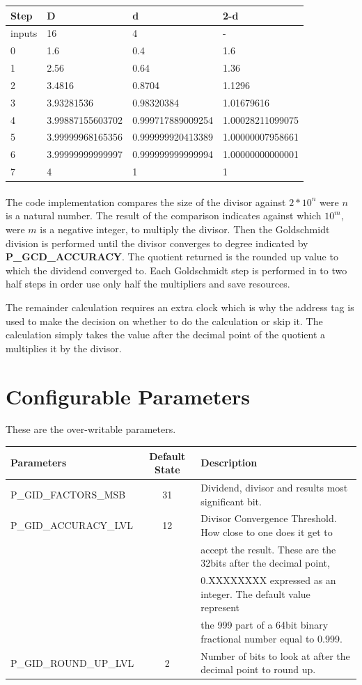 \documentclass[letterpaper]{article}
\begin{document}
	\begin{tabular}{l|l|l|l}
		Step & D & d & 2-d \\ \hline
		inputs & 16 & 4 & - \\
		0 & 1.6 & 0.4 & 1.6 \\
		1 & 2.56 & 0.64 & 1.36 \\
		2 & 3.4816 & 0.8704 & 1.1296 \\
		3 & 3.93281536 & 0.98320384 & 1.01679616 \\
		4 & 3.99887155603702 & 0.999717889009254 & 1.00028211099075 \\
		5 & 3.99999968165356 & 0.999999920413389 & 1.00000007958661 \\
		6 & 3.99999999999997 & 0.999999999999994 & 1.00000000000001 \\
		7 & 4 & 1 & 1 \\
	\end{tabular}
	
	\paragraph{}The code implementation compares the size of the divisor against $ 2*10^n $ were $ n $ is a natural number. The result of the comparison indicates against which $ 10^m $, were $ m $ is a negative integer, to multiply the divisor. Then the Goldschmidt division is performed until the divisor converges to degree indicated by \textbf{P\_GCD\_ACCURACY}. The quotient returned is the rounded up value to which the dividend converged to. Each Goldschmidt step is performed in to two half steps in order use only half the multipliers and save resources.
	
	The remainder calculation requires an extra clock which is why the address tag is used to make the decision on whether to do the calculation or skip it. The calculation simply takes the value after the decimal point of the quotient a multiplies it by the divisor.
	
	\section{Configurable Parameters}
	
	These are the over-writable parameters.
	
	\begin{tabular}{l|c|l}
		Parameters & Default State & Description \\ \hline
		P\_GID\_FACTORS\_MSB &  31 & Dividend, divisor and results most significant bit. \\ \hline
		P\_GID\_ACCURACY\_LVL & 12 & Divisor Convergence Threshold. How close to one does it get to\\   & & accept the result. These are the 32bits after the decimal point,\\
		& & 0.XXXXXXXX expressed as an integer. The default value represent\\
		& & the 999 part of a 64bit binary fractional number equal to 0.999. \\ \hline
		P\_GID\_ROUND\_UP\_LVL &  2 & Number of bits to look at after the decimal point to round up. \\ 
	\end{tabular}
	
\end{document}
